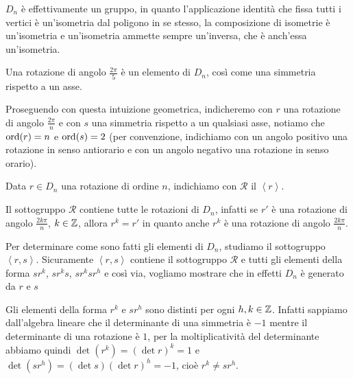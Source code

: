 \documentclass[11pt]{scrartcl}
\begin{document}
\begin{remark}
    $D_n$ è effettivamente un gruppo, in quanto l'applicazione identità che 
    fissa tutti i vertici è un'isometria dal poligono in se stesso, la 
    composizione di isometrie è un'isometria e un'isometria ammette sempre 
    un'inversa, che è anch'essa un'isometria.
\end{remark}

\begin{remark}
    Una rotazione di angolo $\displaystyle\frac{2\pi}{5}$ è un elemento di $D_n$,
    così come una simmetria rispetto a un asse.
\end{remark}

Proseguendo con questa intuizione geometrica, indicheremo con $r$ una rotazione
di angolo $\displaystyle \frac{2\pi}{n}$ e con $s$ una simmetria rispetto a
un qualsiasi asse, notiamo che $\operatorname{ord}(r) = n$ e $\operatorname{ord}(s) = 2$ (per convenzione, 
indichiamo con un angolo positivo una rotazione in senso antiorario e con un 
angolo negativo una rotazione in senso orario).

\begin{definition}
    Data $r \in D_n$ una rotazione di ordine $n$, indichiamo con $\mathcal{R}$ il
     $\left<r\right>$.
\end{definition}

\begin{remark}
    Il sottogruppo $\mathcal{R}$ contiene tutte le rotazioni di $D_n$, infatti
    se $r'$ è una rotazione di angolo $\displaystyle\frac{2k\pi}{n}$, $k \in \mathbb Z$,
    allora $r^k = r'$ in quanto anche $r^k$ è una rotazione di angolo 
    $\displaystyle\frac{2k\pi}{n}$.
\end{remark}

Per determinare come sono fatti gli elementi di $D_n$, studiamo il sottogruppo
$\left<r, s\right>$. Sicuramente $\left<r, s\right>$ contiene il sottogruppo $\mathcal{R}$
e tutti gli elementi della forma $sr^k$, $sr^ks$, $sr^ksr^h$ e così via, vogliamo
mostrare che in effetti $D_n$ è generato da $r$ e $s$

\begin{remark}
    Gli elementi della forma $r^k$ e $sr^h$ sono distinti per ogni $h, k \in \mathbb Z$. 
    Infatti sappiamo dall'algebra lineare che il determinante di una simmetria
    è $-1$ mentre il determinante di una rotazione è $1$, per la moltiplicatività
    del determinante abbiamo quindi $\det (r^k) = (\det r)^k = 1$ e
    $\det (sr^h) = (\det s)(\det r)^h = -1$, cioè $r^k \neq sr^h$.
\end{remark}
\end{document}
